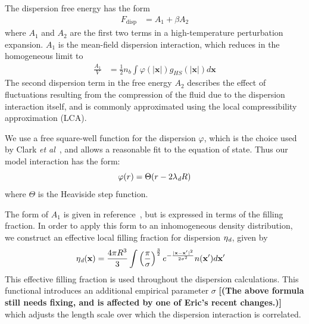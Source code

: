 \documentclass[letterpaper,twocolumn,amsmath,amssymb,prb]{revtex4-1}
\newcommand{\red}[1]{{\bf \color{red} #1}}
\newcommand{\xx}{\textbf{x}}
\newcommand{\fixme}[1]{\red{[#1]}}
\begin{document}
The dispersion free energy has the form~\cite{gil-villegas-1997-SAFT-VR}
\begin{align}
  F_\text{disp} &= A_1 + \beta A_2
\end{align}
where $A_1$ and $A_2$ are the first two terms in a high-temperature
perturbation expansion.  $A_1$ is the mean-field dispersion
interaction, which reduces in the homogeneous limit to
\begin{align}\label{eq:A1-simple}
  \frac{A_1}{V} &= \frac12 n_b \int \varphi(\left|\xx\right|)
  g_{HS}(\left|\xx\right|) d\xx
\end{align}
The second dispersion term in the free energy $A_2$ describes the
effect of fluctuations resulting from the compression of the fluid due
to the dispersion interaction itself, and is commonly approximated
using the local compressibility approximation (LCA).

We use a free square-well function for the dispersion $\varphi$, which
is the choice used by Clark \emph{et al}~\cite{clark2006developing},
and allows a reasonable fit to the equation of state.  Thus our model
interaction has the form:
\begin{equation}
  \varphi(r) = \Theta(r-2 \lambda_\textit{d} R)
\end{equation}
where $\Theta$ is the Heaviside step function.

The form of $A_1$ is given in
reference~\cite{gil-villegas-1997-SAFT-VR}, but is expressed in terms
of the filling fraction.  In order to apply this form to an
inhomogeneous density distribution, we construct an effective local
filling fraction for dispersion $\eta_\textit{d}$, given by
\begin{align}
  \etadisp(\xx) &= \frac{4\pi R^3}{3}
  \int \left(\frac{\pi}{\sigma}\right)^{\frac32}
  e^{-\frac{|\xx-\xx'|^2}{2\sigma^2}} n(\xx') d\xx'
\end{align}
This effective filling fraction is used throughout the dispersion
calculations.  This functional introduces an additional empirical
parameter $\sigma$ \fixme{(The above formula still needs fixing, and
  is affected by one of Eric's recent changes.)}
which adjusts the length scale over which the dispersion interaction
is correlated.
\end{document}
